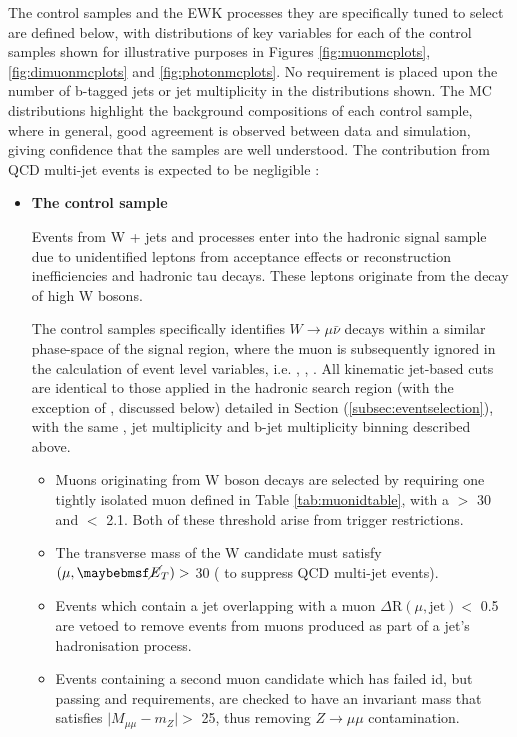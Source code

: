 The control samples and the \ac{EWK} processes they are specifically tuned to select are defined below, with distributions of key variables for each of the control samples shown for illustrative purposes in Figures \ref{fig:muonmcplots}, \ref{fig:dimuonmcplots} and \ref{fig:photonmcplots}. No requirement is placed upon the number of b-tagged jets or jet multiplicity in the distributions shown. The MC distributions highlight the background compositions of each control sample, where in general, good agreement is observed between data and simulation, giving confidence that the samples are well understood. The contribution from QCD multi-jet events is expected to be negligible : 

\begin{itemize} 

\item[] \textbf{The \mupjets control sample}

Events from W + jets and \ttbar processes enter into the hadronic signal sample due to unidentified leptons from acceptance effects or reconstruction inefficiencies and hadronic tau decays. These leptons originate from the decay of high \pt W bosons. 

The control samples specifically identifies $W \rightarrow \mu\bar{\nu}$ decays within a similar phase-space of the signal region, where the muon is subsequently ignored in the calculation of event level variables, i.e. \theht, \mht, \alphat. All kinematic jet-based cuts are identical to those applied in the hadronic search region (with the exception of \alphat, discussed below) detailed in Section (\ref{subsec:eventselection}), with the same \theht, jet multiplicity and b-jet multiplicity binning described above.

\begin{itemize}
\item Muons originating from W boson decays are selected by requiring one tightly isolated muon defined in Table \ref{tab:muonidtable}, with a \pt $>$ 30 \GeV and \abeta $<$ 2.1. Both of these threshold arise from trigger restrictions.  
\item The transverse mass of the W candidate must satisfy \mt$(\mu,\met) >$ 30 \GeV ( to suppress QCD multi-jet events). 
\item Events which contain a jet overlapping with a muon $\Delta \text{R}(\mu,\text{jet}) <$ 0.5 are vetoed to remove events from muons produced as part of a jet's hadronisation process. 
\item Events containing a second muon candidate which has failed id, but passing \pt and \abeta requirements, are checked to have an invariant mass that satisfies $ \lvert M_{\mu\mu} - m_{Z}\rvert >$ 25, thus removing $Z \rightarrow \mu\mu$ contamination.
\end{itemize}



\end{itemize}
